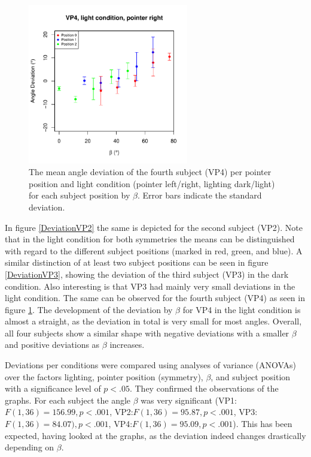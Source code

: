 \begin{figure}
    \includegraphics[width = 7cm]{Images/plots/AngleDevVP4LightRight.pdf}
    \caption{The mean angle deviation of the fourth subject (VP4) per pointer position and light condition (pointer left/right, lighting dark/light) for each subject position by $\beta$. Error bars indicate the standard deviation.} 
    \label{DeviationVP4}
\end{figure}

In figure \ref{DeviationVP2} the same is depicted for the second subject (VP2). Note that in the light condition for both symmetries the means can be distinguished with regard to the different subject positions (marked in red, green, and blue). A similar distinction of at least two subject positions can be seen in figure \ref{DeviationVP3}, showing the deviation of the third subject (VP3) in the dark condition. Also interesting is that VP3 had mainly very small deviations in the light condition. The same can be observed for the fourth subject (VP4) as seen in figure \ref{DeviationVP4}. The development of the deviation by $\beta$ for VP4 in the light condition is almost a straight, as the deviation in total is very small for most angles. 
Overall, all four subjects show a similar shape with negative deviations with a smaller $\beta$ and positive deviations as $\beta$ increases.

Deviations per conditions were compared using analyses of variance (ANOVAs) over the factors lighting, pointer position (symmetry), $\beta$, and subject position with a significance level of $p < .05$. They confirmed the observations of the graphs. For each subject the angle $\beta$ was very sig\-ni\-fi\-cant (VP1:$F(1,36) = 156.99, p < .001$, VP2:$F(1,36) = 95.87, p < .001$, VP3:$F(1,36) = 84.07), p < .001$, VP4:$F(1,36)= 95.09, p < .001$). This has been expected, having looked at the graphs, as the deviation indeed changes drastically depending on $\beta$.

